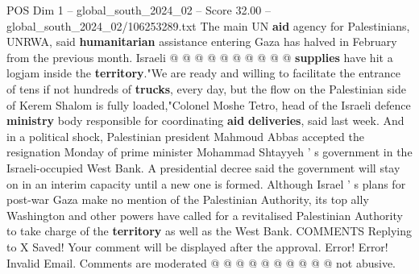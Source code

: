 \begin{textsample}{POS Dim 1 – global\_south\_2024\_02 – Score 32.00 – global\_south\_2024\_02/106253289.txt}
The main UN \textbf{aid} agency for Palestinians, UNRWA, said \textbf{humanitarian} assistance entering Gaza has halved in February from the previous month.
Israeli @ @ @ @ @ @ @ @ @ @ \textbf{supplies} have hit a logjam inside the \textbf{territory}."We are ready and willing to facilitate the entrance of tens if not hundreds of \textbf{trucks}, every day, but the flow on the Palestinian side of Kerem Shalom is fully loaded,"Colonel Moshe Tetro, head of the Israeli defence \textbf{ministry} body responsible for coordinating \textbf{aid} \textbf{deliveries}, said last week.
And in a political shock, Palestinian president Mahmoud Abbas accepted the resignation Monday of prime minister Mohammad Shtayyeh ' s government in the Israeli-occupied West Bank.
A presidential decree said the government will stay on in an interim capacity until a new one is formed.
Although Israel ' s plans for post-war Gaza make no mention of the Palestinian Authority, its top ally Washington and other powers have called for a revitalised Palestinian Authority to take charge of the \textbf{territory} as well as the West Bank.
COMMENTS Replying to X Saved!
Your comment will be displayed after the approval.
Error!
Error!
Invalid Email.
Comments are moderated @ @ @ @ @ @ @ @ @ @ not abusive.

\end{textsample}
